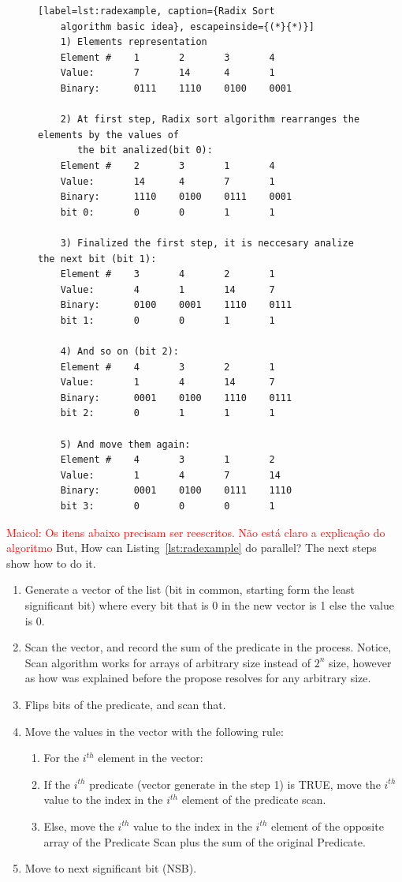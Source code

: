 \documentclass[Ingles]{ic-tese-v1}
\newcommand{\marcio}[1]{\textcolor{red}{ {#1}}}
\newcommand{\marcio}[1]{}
\newcommand{\rlst}[1]{Listing~\ref{lst:#1}}
\begin{document}
\begin{figure}[t]
	\lstset{basicstyle=\scriptsize}
	\begin{lstlisting}[label=lst:radexample, caption={Radix Sort
	algorithm basic idea}, escapeinside={(*}{*)}]
	1) Elements representation
	Element #    1       2       3       4
	Value:       7       14      4       1
	Binary:      0111    1110    0100    0001

	2) At first step, Radix sort algorithm rearranges the elements by the values of
	   the bit analized(bit 0):
	Element #    2       3       1       4
	Value:       14      4       7       1
	Binary:      1110    0100    0111    0001
	bit 0:       0       0       1       1

	3) Finalized the first step, it is neccesary analize the next bit (bit 1):
	Element #    3       4       2       1
	Value:       4       1       14      7
	Binary:      0100    0001    1110    0111
	bit 1:       0       0       1       1

	4) And so on (bit 2):
	Element #    4       3       2       1
	Value:       1       4       14      7
	Binary:      0001    0100    1110    0111
	bit 2:       0       1       1       1

	5) And move them again:
	Element #    4       3       1       2
	Value:       1       4       7       14
	Binary:      0001    0100    0111    1110
	bit 3:       0       0       0       1

	\end{lstlisting}
\end{figure}

\marcio{Maicol: Os itens abaixo precisam ser reescritos. Não está claro a explicação do algoritmo}
But, How can \rlst{radexample} do parallel?
The next steps show how to do it.
\begin{enumerate}
\item Generate a vector of the list (bit in common, starting form the least significant bit)
where every bit that is 0 in the new vector is 1 else the value is 0.
\item Scan the vector, and record the sum of the predicate in the process. Notice, Scan
algorithm works for arrays of arbitrary size instead of $2^{n}$ size, however as how was
explained before the propose resolves for any arbitrary size.
\item Flips bits of the predicate, and scan that.
\item Move the values in the vector with the following rule:
\begin{enumerate}
\item For the $i^{th}$ element in the vector:
\item If the $i^{th}$ predicate (vector generate in the step 1) is TRUE, move the $i^{th}$
value to the index in the $i^{th}$ element of the predicate scan.
\item Else, move the $i^{th}$ value to the index in the $i^{th}$ element of the opposite array
of the Predicate Scan plus the sum of the original Predicate.
\end{enumerate}
\item Move to next significant bit (NSB).
\end{enumerate}
\end{document}
